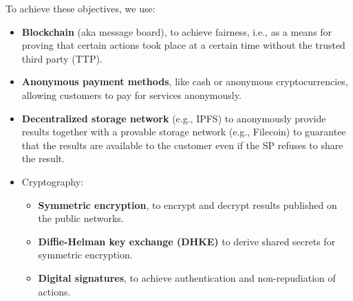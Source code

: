 \documentclass[pdftex,twocolumn,epjc3]{svjour3}
\begin{document}
To achieve these objectives, we use:
\begin{itemize}
    \item \textbf{Blockchain} (aka message board), to achieve fairness, i.e., as a means for proving that certain actions took place at a certain time without the trusted third party (TTP).
    \item \textbf{Anonymous payment methods}, like cash or anonymous cryptocurrencies, allowing customers to pay for services anonymously.
    \item \textbf{Decentralized storage network} (e.g., IPFS) to anonymously provide results together with a provable storage network (e.g., Filecoin) to guarantee that the results are available to the customer even if the SP refuses to share the result.
    
    \item Cryptography:
    \begin{itemize}
        \item \textbf{Symmetric encryption}, to encrypt and decrypt results published on the public networks.
        \item \textbf{Diffie-Helman key exchange (DHKE)} to derive shared secrets for symmetric encryption.
        \item \textbf{Digital signatures}, to achieve authentication and non-repudiation of actions. 
    \end{itemize}
    
\end{itemize}
\end{document}
